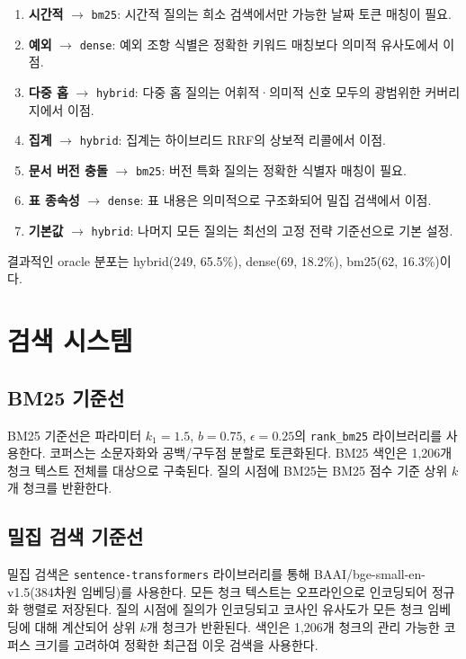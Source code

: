 \begin{enumerate}
    \item \textbf{시간적} $\rightarrow$ \texttt{bm25}: 시간적 질의는 희소 검색에서만 가능한 날짜 토큰 매칭이 필요.
    \item \textbf{예외} $\rightarrow$ \texttt{dense}: 예외 조항 식별은 정확한 키워드 매칭보다 의미적 유사도에서 이점.
    \item \textbf{다중 홉} $\rightarrow$ \texttt{hybrid}: 다중 홉 질의는 어휘적·의미적 신호 모두의 광범위한 커버리지에서 이점.
    \item \textbf{집계} $\rightarrow$ \texttt{hybrid}: 집계는 하이브리드 RRF의 상보적 리콜에서 이점.
    \item \textbf{문서 버전 충돌} $\rightarrow$ \texttt{bm25}: 버전 특화 질의는 정확한 식별자 매칭이 필요.
    \item \textbf{표 종속성} $\rightarrow$ \texttt{dense}: 표 내용은 의미적으로 구조화되어 밀집 검색에서 이점.
    \item \textbf{기본값} $\rightarrow$ \texttt{hybrid}: 나머지 모든 질의는 최선의 고정 전략 기준선으로 기본 설정.
\end{enumerate}

결과적인 oracle 분포는 hybrid(249, 65.5\%), dense(69, 18.2\%), bm25(62, 16.3\%)이다.

\section{검색 시스템}
\label{sec:method_retrieval_ko}

\subsection{BM25 기준선}

BM25 기준선은 파라미터 $k_1{=}1.5$, $b{=}0.75$, $\epsilon{=}0.25$의 \texttt{rank\_bm25} 라이브러리를 사용한다. 코퍼스는 소문자화와 공백/구두점 분할로 토큰화된다. BM25 색인은 1,206개 청크 텍스트 전체를 대상으로 구축된다. 질의 시점에 BM25는 BM25 점수 기준 상위 $k$개 청크를 반환한다.

\subsection{밀집 검색 기준선}

밀집 검색은 \texttt{sentence-transformers} 라이브러리를 통해 BAAI/bge-small-en-v1.5(384차원 임베딩)를 사용한다. 모든 청크 텍스트는 오프라인으로 인코딩되어 정규화 행렬로 저장된다. 질의 시점에 질의가 인코딩되고 코사인 유사도가 모든 청크 임베딩에 대해 계산되어 상위 $k$개 청크가 반환된다. 색인은 1,206개 청크의 관리 가능한 코퍼스 크기를 고려하여 정확한 최근접 이웃 검색을 사용한다.

